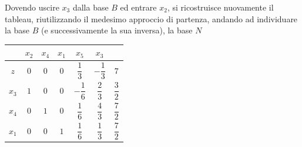 \documentclass[a4paper]{extarticle}
\renewcommand\arraystretch{}
\begin{document}
\vspace{1em}
\noindent
Dovendo uscire $x_3$ dalla base $B$ ed entrare $x_2$, si ricostruisce nuovamente il tableau, riutilizzando il medesimo approccio di partenza, andando ad individuare la base $B$ (e successivamente la sua inversa), la base $N$

\vspace{1em}
\noindent
\begin{table}[H]
    \setlength{\tabcolsep}{4pt}
    \renewcommand{\arraystretch}{2.2}
    \noindent
    \centering
    \begin{tabular}{|c|ccc|cc|c|}
        & $x_2$ & $x_4$ & $x_1$ & $x_5$ & $x_3$ &\\
        \hline
        $z$ & $0$ & $0$ & $0$ & $\dfrac{1}{3}$ & $-\dfrac{1}{3}$ & $7$\\
        \hline
        $x_3$ & \cellcolor{red!50!white}$1$ & \cellcolor{red!50!white}$0$ & \cellcolor{red!50!white}$0$ & \cellcolor{blue!50!white}$-\dfrac{1}{6}$ & \cellcolor{blue!50!white}$\dfrac{2}{3}$ & \cellcolor{orange!25!white}$\dfrac{3}{2}$\\
        $x_4$ & \cellcolor{red!50!white}$0$ & \cellcolor{red!50!white}$1$ & \cellcolor{red!50!white}$0$ & \cellcolor{blue!50!white}$\dfrac{1}{6}$ & \cellcolor{blue!50!white}$\dfrac{4}{3}$ & \cellcolor{orange!25!white}$\dfrac{7}{2}$\\
        $x_1$ & \cellcolor{red!50!white}$0$ & \cellcolor{red!50!white}$0$ & \cellcolor{red!50!white}$1$ & \cellcolor{blue!50!white}$\dfrac{1}{6}$ & \cellcolor{blue!50!white}$\dfrac{1}{3}$ & \cellcolor{orange!25!white}$\dfrac{7}{2}$\\
        \hline
    \end{tabular}
\end{table}
\end{document}
